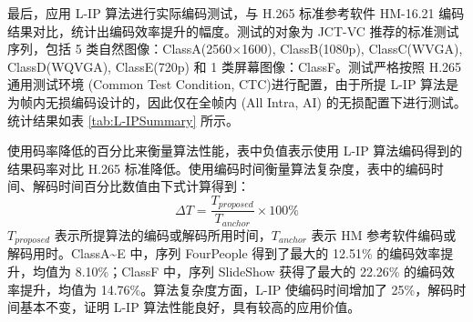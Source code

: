 最后，应用 L-IP 算法进行实际编码测试，与 H.265 标准参考软件 HM-16.21 编码结果对比，统计出编码效率提升的幅度。测试的对象为 JCT-VC 推荐的标准测试序列，包括 5 类自然图像：ClassA(2560$\times$1600), ClassB(1080p), ClassC(WVGA), ClassD(WQVGA), ClassE(720p) 和 1 类屏幕图像：ClassF。测试严格按照 H.265 通用测试环境 (Common Test Condition, CTC)进行配置，由于所提 L-IP 算法是为帧内无损编码设计的，因此仅在全帧内 (All Intra, AI) 的无损配置下进行测试。统计结果如表 \ref{tab:L-IPSummary} 所示。

使用码率降低的百分比来衡量算法性能，表中负值表示使用 L-IP 算法编码得到的结果码率对比 H.265 标准降低。使用编码时间衡量算法复杂度，表中的编码时间、解码时间百分比数值由下式计算得到：
\begin{equation}
    \Delta T=\frac{T_{proposed}}{T_{anchor}}\times 100\%
\end{equation}
$T_{proposed}$ 表示所提算法的编码或解码所用时间，$T_{anchor}$ 表示 HM 参考软件编码或解码用时。ClassA\textasciitilde E 中，序列 FourPeople 得到了最大的 12.51\% 的编码效率提升，均值为 8.10\%；ClassF 中，序列 SlideShow 获得了最大的 22.26\% 的编码效率提升，均值为 14.76\%。算法复杂度方面，L-IP 使编码时间增加了 25\%，解码时间基本不变，证明 L-IP 算法性能良好，具有较高的应用价值。
